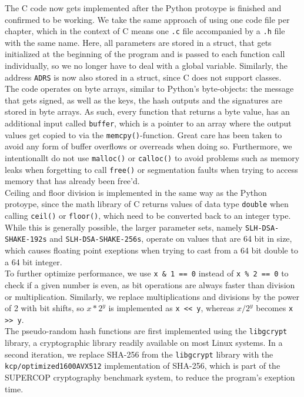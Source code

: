 \documentclass[journal=tosc,notanonymous]{iacrtrans}
\begin{document}
The C code now gets implemented after the Python protoype is finished and confirmed to be working.
We take the same approach of using one code file per chapter, which in the context of C means one \texttt{.c} file accompanied by a \texttt{.h} file with the same name.
Here, all parameters are stored in a struct, that gets initialized at the beginning of the program and is passed to each function call individually, so we no longer have to deal with a global variable.
Similarly, the address \texttt{ADRS} is now also stored in a struct, since C does not support classes.
\\
The code operates on byte arrays, similar to Python's byte-objects: the message that gets signed, as well as the keys, the hash outputs and the signatures are stored in byte arrays.
As such, every function that returns a byte value, has an additional input called \texttt{buffer}, which is a pointer to an array where the output values get copied to via the \texttt{memcpy()}-function.
Great care has been taken to avoid any form of buffer overflows or overreads when doing so.
Furthermore, we intentionallt do not use \texttt{malloc()} or \texttt{calloc()} to avoid problems such as memory leaks when forgetting to call \texttt{free()} or segmentation faults when trying to access memory that has already been free'd.
\\
Ceiling and floor division is implemented in the same way as the Python protoype, since the math library of C returns values of data type \texttt{double} when calling \texttt{ceil()} or \texttt{floor()}, which need to be converted back to an integer type.
While this is generally possible, the larger parameter sets, namely \texttt{SLH-DSA-SHAKE-192s} and \texttt{SLH-DSA-SHAKE-256s}, operate on values that are 64 bit in size, which causes floating point exeptions when trying to cast from a 64 bit double to a 64 bit integer.
\\
To further optimize performance, we use \texttt{x \& 1 == 0} instead of \texttt{x \% 2 == 0} to check if a given number is even, as bit operations are always faster than division or multiplication.
Similarly, we replace multiplications and divisions by the power of 2 with bit shifts, so $x * 2^y$ is implemented as \texttt{x << y}, whereas $x / 2^y$ becomes \texttt{x >> y}.
\\
The pseudo-random hash functions are first implemented using the \texttt{libgcrypt} library, a cryptographic library readily available on most Linux systems.
In a second iteration, we replace SHA-256 from the \texttt{libgcrypt} library with the \texttt{kcp/optimized1600AVX512} implementation of SHA-256, which is part of the SUPERCOP cryptography benchmark system, to reduce the program's exeption time.
\end{document}
